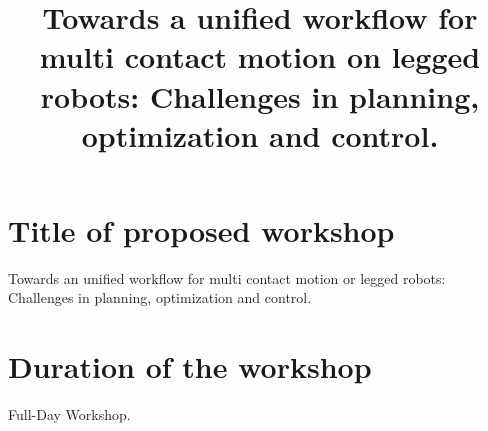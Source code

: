 \documentclass[12pt]{article}
\begin{document}
\title{\vspace{-4ex}Towards a unified workflow for multi contact motion on legged robots: Challenges in planning, optimization and control.}
\maketitle


\section{\textbf{Title} of proposed workshop}
Towards an unified workflow for multi contact motion or legged robots: Challenges in planning, optimization and control.

\section{Duration of the workshop}
Full-Day Workshop.
\end{document}
